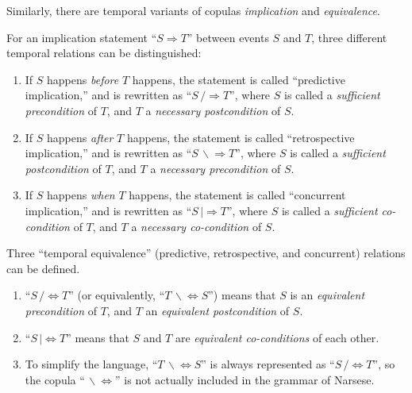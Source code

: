 Similarly, there are temporal variants of copulas \emph{implication} and \emph{equivalence}. 

\begin{defi}
For an implication statement ``\(S \Rightarrow T\)'' between events $S$ and $T$, three different temporal relations can be distinguished:
\begin{enumerate}
	\item 
If $S$ happens \emph{before} $T$ happens, the statement is called ``predictive implication,'' and is rewritten as ``\(S \,/\!\!\!\Rightarrow T\)'', where $S$ is called a {\em sufficient precondition} of $T$, and $T$ a {\em necessary postcondition} of $S$.
	\item 
If $S$ happens \emph{after} $T$ happens, the statement is called ``retrospective implication,'' and  is rewritten as ``\(S \,\backslash\!\!\!\Rightarrow T\)'', where $S$ is called a {\em sufficient postcondition} of $T$, and $T$ a {\em necessary precondition} of $S$.
	\item 
If $S$ happens \emph{when} $T$ happens, the statement is called ``concurrent implication,'' and is rewritten as ``\(S \,|\!\!\!\Rightarrow T\)'', where $S$ is called a {\em sufficient co-condition} of $T$, and $T$ a {\em necessary co-condition} of $S$.
\end{enumerate}
\end{defi}

\begin{defi}
Three ``temporal equivalence'' (predictive, retrospective, and concurrent) relations can be defined. 
\begin{enumerate}
	\item 
``\(S \,/\!\!\!\Leftrightarrow T\)'' (or equivalently, ``\(T \,\backslash\!\!\!\Leftrightarrow S\)'') means that $S$ is an {\em equivalent precondition} of $T$, and $T$ an {\em equivalent postcondition} of $S$.
	\item 
``\(S \,|\!\!\!\Leftrightarrow T\)'' means that $S$ and $T$ are {\em equivalent co-conditions} of each other.
  \item
To simplify the language, ``\(T \,\backslash\!\!\!\Leftrightarrow S\)'' is always represented as ``\(S \,/\!\!\!\Leftrightarrow T\)'', so the copula ``$\,\backslash\!\!\!\Leftrightarrow$'' is not actually included in the grammar of Narsese.  
\end{enumerate}
\end{defi}

